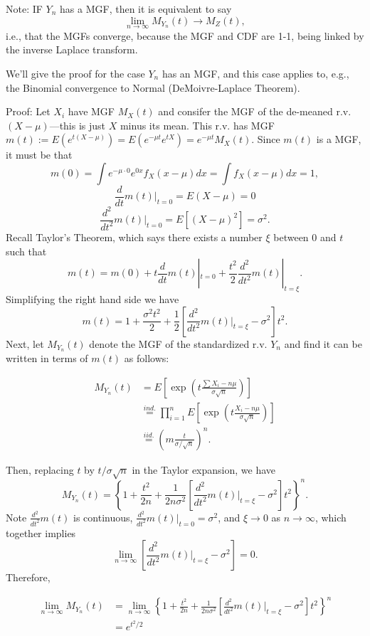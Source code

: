 \documentclass[]{book}
\begin{document}
Note: IF \(Y_n\) has a MGF, then it is equivalent to say
\[\lim_{n\rightarrow \infty}M_{Y_n}(t) \rightarrow M_Z(t),\] i.e., that
the MGFs converge, because the MGF and CDF are 1-1, being linked by the
inverse Laplace transform.

We'll give the proof for the case \(Y_n\) has an MGF, and this case
applies to, e.g., the Binomial convergence to Normal (DeMoivre-Laplace
Theorem).

Proof: Let \(X_i\) have MGF \(M_X(t)\) and consifer the MGF of the
de-meaned r.v. \((X - \mu)\)---this is just \(X\) minus its mean. This
r.v. has MGF
\(m(t):=E(e^{t(X-\mu)}) = E(e^{-\mu t}e^{tX}) = e^{-\mu t}M_X(t)\).
Since \(m(t)\) is a MGF, it must be that
\[m(0) = \int e^{-\mu \cdot 0}e^{0 x}f_X(x-\mu)dx = \int f_X(x-\mu)dx = 1,\]
\[\frac{d}{dt}m(t)|_{t=0} = E(X-\mu) = 0\]
\[\frac{d^2}{dt^2}m(t)|_{t=0} = E[(X-\mu)^2] = \sigma^2.\] Recall
Taylor's Theorem, which says there exists a number \(\xi\) between \(0\)
and \(t\) such that
\[m(t) = m(0) + t \frac{d}{dt}m(t)|_{t=0} + \frac{t^2}{2}\frac{d^2}{dt^2}m(t)|_{t=\xi}.\]
Simplifying the right hand side we have
\[m(t) = 1 + \frac{\sigma^2 t^2}{2} + \frac{1}{2}\left[\frac{d^2}{dt^2}m(t)|_{t=\xi} - \sigma^2\right]t^2.\]
Next, let \(M_{Y_n}(t)\) denote the MGF of the standardized r.v. \(Y_n\)
and find it can be written in terms of \(m(t)\) as follows:

\begin{align*}
M_{Y_n}(t) & = E\left[\exp\left(t\frac{\sum X_i - n\mu}{\sigma \sqrt{n}}\right)\right]\\
& \stackrel{ind.}{=}\prod_{i=1}^n E\left[\exp\left(t\frac{X_i - n\mu}{\sigma \sqrt{n}}\right)\right]\\
& \stackrel{iid.}{=}\left(m\frac{t}{\sigma/\sqrt{n}}\right)^n.
\end{align*}

Then, replacing \(t\) by \(t/\sigma\sqrt n\) in the Taylor expansion, we
have
\[M_{Y_n}(t) = \left\{1 + \frac{t^2}{2n} + \frac{1}{2n\sigma^2}\left[\frac{d^2}{dt^2}m(t)|_{t=\xi} - \sigma^2\right]t^2\right\}^n.\]
Note \(\frac{d^2}{dt^2}m(t)\) is continuous,
\(\frac{d^2}{dt^2}m(t)|_{t=0} = \sigma^2\), and \(\xi \rightarrow 0\) as
\(n\rightarrow \infty\), which together implies
\[\lim_{n\rightarrow \infty}\left[\frac{d^2}{dt^2}m(t)|_{t=\xi} - \sigma^2\right] = 0.\]
Therefore,

\begin{align*}
\lim_{n\rightarrow \infty} M_{Y_n}(t) & = \lim_{n\rightarrow \infty}\left\{1 + \frac{t^2}{2n} + \frac{1}{2n\sigma^2}\left[\frac{d^2}{dt^2}m(t)|_{t=\xi} - \sigma^2\right]t^2\right\}^n \\
& = e^{t^2/2}
\end{align*}
\end{document}
